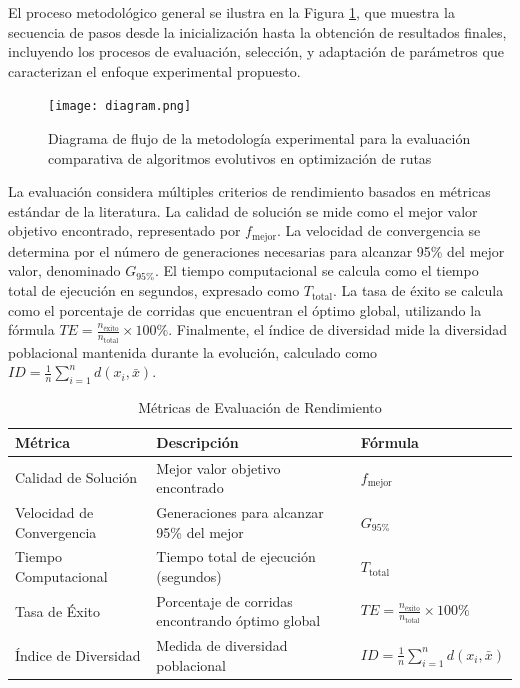 \documentclass[12pt,a4paper]{article}
\begin{document}
El proceso metodológico general se ilustra en la Figura \ref{fig:methodology_flowchart}, que muestra la secuencia de pasos desde la inicialización hasta la obtención de resultados finales, incluyendo los procesos de evaluación, selección, y adaptación de parámetros que caracterizan el enfoque experimental propuesto.

\begin{figure}[H]
\centering
\texttt{[image: diagram.png]}
\caption{Diagrama de flujo de la metodología experimental para la evaluación comparativa de algoritmos evolutivos en optimización de rutas}
\label{fig:methodology_flowchart}
\end{figure}

La evaluación considera múltiples criterios de rendimiento basados en métricas estándar de la literatura. La calidad de solución se mide como el mejor valor objetivo encontrado, representado por $f_{\text{mejor}}$. La velocidad de convergencia se determina por el número de generaciones necesarias para alcanzar 95\% del mejor valor, denominado $G_{95\%}$. El tiempo computacional se calcula como el tiempo total de ejecución en segundos, expresado como $T_{\text{total}}$. La tasa de éxito se calcula como el porcentaje de corridas que encuentran el óptimo global, utilizando la fórmula $TE = \frac{n_{\text{éxito}}}{n_{\text{total}}} \times 100\%$. Finalmente, el índice de diversidad mide la diversidad poblacional mantenida durante la evolución, calculado como $ID = \frac{1}{n}\sum_{i=1}^{n}d(x_i, \bar{x})$.

\begin{table}[H]
\centering
\caption{Métricas de Evaluación de Rendimiento}
\begin{tabular}{@{}lll@{}}
\toprule
\textbf{Métrica} & \textbf{Descripción} & \textbf{Fórmula} \\
\midrule
Calidad de Solución & Mejor valor objetivo encontrado & $f_{\text{mejor}}$ \\
Velocidad de Convergencia & Generaciones para alcanzar 95\% del mejor & $G_{95\%}$ \\
Tiempo Computacional & Tiempo total de ejecución (segundos) & $T_{\text{total}}$ \\
Tasa de Éxito & Porcentaje de corridas encontrando óptimo global & $TE = \frac{n_{\text{éxito}}}{n_{\text{total}}} \times 100\%$ \\
Índice de Diversidad & Medida de diversidad poblacional & $ID = \frac{1}{n}\sum_{i=1}^{n}d(x_i, \bar{x})$ \\
\bottomrule
\end{tabular}
\label{tab:metrics}
\end{table}
\end{document}
